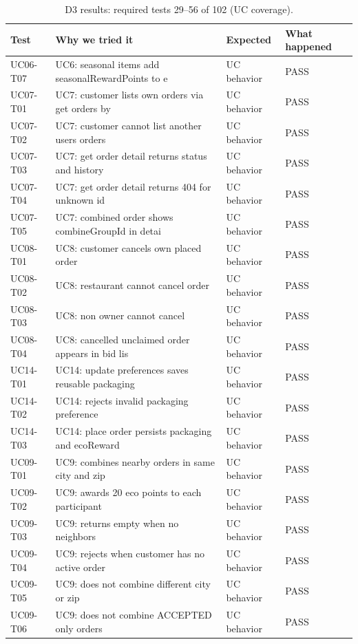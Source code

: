 \begin{table}[t]
\caption{D3 results: required tests 29--56 of 102 (UC coverage).}
\label{tab:d3r2}
\centering\scriptsize
\begin{tabular}{p{3.8cm}p{3.6cm}p{2.8cm}p{2.0cm}}
\toprule
Test & Why we tried it & Expected & What happened \\
\midrule
UC06-T07 & UC6: seasonal items add seasonalRewardPoints to e & UC behavior & PASS \\
UC07-T01 & UC7: customer lists own orders via get orders by  & UC behavior & PASS \\
UC07-T02 & UC7: customer cannot list another users orders & UC behavior & PASS \\
UC07-T03 & UC7: get order detail returns status and history & UC behavior & PASS \\
UC07-T04 & UC7: get order detail returns 404 for unknown id & UC behavior & PASS \\
UC07-T05 & UC7: combined order shows combineGroupId in detai & UC behavior & PASS \\
UC08-T01 & UC8: customer cancels own placed order & UC behavior & PASS \\
UC08-T02 & UC8: restaurant cannot cancel order & UC behavior & PASS \\
UC08-T03 & UC8: non owner cannot cancel & UC behavior & PASS \\
UC08-T04 & UC8: cancelled unclaimed order appears in bid lis & UC behavior & PASS \\
UC14-T01 & UC14: update preferences saves reusable packaging & UC behavior & PASS \\
UC14-T02 & UC14: rejects invalid packaging preference & UC behavior & PASS \\
UC14-T03 & UC14: place order persists packaging and ecoReward & UC behavior & PASS \\
UC09-T01 & UC9: combines nearby orders in same city and zip & UC behavior & PASS \\
UC09-T02 & UC9: awards 20 eco points to each participant & UC behavior & PASS \\
UC09-T03 & UC9: returns empty when no neighbors & UC behavior & PASS \\
UC09-T04 & UC9: rejects when customer has no active order & UC behavior & PASS \\
UC09-T05 & UC9: does not combine different city or zip & UC behavior & PASS \\
UC09-T06 & UC9: does not combine ACCEPTED only orders & UC behavior & PASS \\

\end{tabular}
\end{table}
